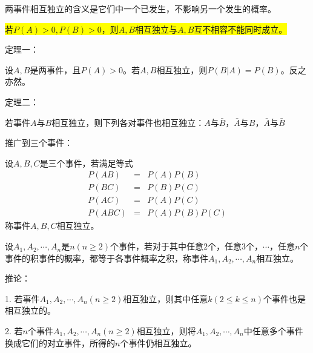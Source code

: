 \documentclass[12pt,a4paper]{article}
\begin{document}
两事件相互独立的含义是它们中一个已发生，不影响另一个发生的概率。

\colorbox{yellow}{若$P(A) > 0, P(B) > 0$，则$A, B$相互独立与$A, B$互不相容不能同时成立。}

定理一：

设$A, B$是两事件，且$P(A) > 0$。若$A, B$相互独立，则$P(B|A) = P(B)$。反之亦然。

定理二：

若事件$A$与$B$相互独立，则下列各对事件也相互独立：$A$与$\bar{B}$，$\bar{A}$与$B$，$\bar{A}$与$\bar{B}$

推广到三个事件：

设$A, B, C$是三个事件，若满足等式
\begin{eqnarray}
\nonumber P(AB) &=& P(A) P(B) \\
\nonumber P(BC) &=& P(B) P(C) \\
\nonumber P(AC) &=& P(A) P(C) \\
P(ABC) &=& P(A) P(B) P(C) 
\end{eqnarray}
称事件$A, B, C$相互独立。

设$A_1, A_2, \cdots, A_n$是$n(n \geqslant 2)$个事件，若对于其中任意$2$个，任意$3$个，$\cdots$，任意$n$个事件的积事件的概率，都等于各事件概率之积，称事件$A_1, A_2, \cdots, A_n$相互独立。

推论：

1. 若事件$A_1, A_2, \cdots, A_n (n \geqslant 2)$相互独立，则其中任意$k(2 \leqslant k \leqslant n)$个事件也是相互独立的。

2. 若$n$个事件$A_1, A_2, \cdots, A_n (n \geqslant 2)$相互独立，则将$A_1, A_2, \cdots, A_n$中任意多个事件换成它们的对立事件，所得的$n$个事件仍相互独立。
\end{document}
